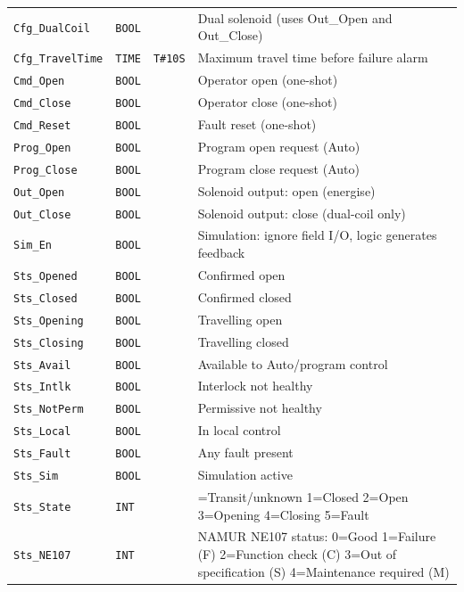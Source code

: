 {\begin{longtable}{@{}>{\raggedright\arraybackslash}p{3.4cm}>{\raggedright\arraybackslash}p{3.3cm}>{\raggedright\arraybackslash}p{1.3cm}>{\raggedright\arraybackslash}p{6.4cm}@{}}
\texttt{Cfg\_DualCoil} & \texttt{BOOL} &  & Dual solenoid (uses Out\_Open and Out\_Close) \\
\texttt{Cfg\_TravelTime} & \texttt{TIME} & \texttt{T\#10S} & Maximum travel time before failure alarm \\
\texttt{Cmd\_Open} & \texttt{BOOL} &  & Operator open (one-shot) \\
\texttt{Cmd\_Close} & \texttt{BOOL} &  & Operator close (one-shot) \\
\texttt{Cmd\_Reset} & \texttt{BOOL} &  & Fault reset (one-shot) \\
\texttt{Prog\_Open} & \texttt{BOOL} &  & Program open request (Auto) \\
\texttt{Prog\_Close} & \texttt{BOOL} &  & Program close request (Auto) \\
\texttt{Out\_Open} & \texttt{BOOL} &  & Solenoid output: open (energise) \\
\texttt{Out\_Close} & \texttt{BOOL} &  & Solenoid output: close (dual-coil only) \\
\texttt{Sim\_En} & \texttt{BOOL} &  & Simulation: ignore field I/\allowbreak{}O, logic generates feedback \\
\texttt{Sts\_Opened} & \texttt{BOOL} &  & Confirmed open \\
\texttt{Sts\_Closed} & \texttt{BOOL} &  & Confirmed closed \\
\texttt{Sts\_Opening} & \texttt{BOOL} &  & Travelling open \\
\texttt{Sts\_Closing} & \texttt{BOOL} &  & Travelling closed \\
\texttt{Sts\_Avail} & \texttt{BOOL} &  & Available to Auto/\allowbreak{}program control \\
\texttt{Sts\_Intlk} & \texttt{BOOL} &  & Interlock not healthy \\
\texttt{Sts\_NotPerm} & \texttt{BOOL} &  & Permissive not healthy \\
\texttt{Sts\_Local} & \texttt{BOOL} &  & In local control \\
\texttt{Sts\_Fault} & \texttt{BOOL} &  & Any fault present \\
\texttt{Sts\_Sim} & \texttt{BOOL} &  & Simulation active \\
\texttt{Sts\_State} & \texttt{INT} &  & 0=Transit/\allowbreak{}unknown 1=Closed 2=Open 3=Opening 4=Closing 5=Fault \\
\texttt{Sts\_NE107} & \texttt{INT} &  & NAMUR NE107 status: 0=Good 1=Failure (F) 2=Function check (C) 3=Out of specification (S) 4=Maintenance required (M) \\

\end{longtable}}
